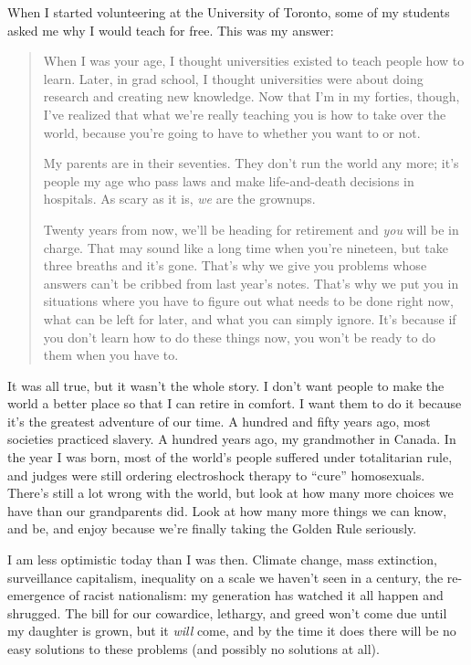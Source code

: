 
When I started volunteering at the University of Toronto,
some of my students asked me why I would teach for free.
This was my answer:

\begin{quote}

When I was your age,
I thought universities existed to teach people how to learn.
Later,
in grad school,
I thought universities were about doing research and creating new knowledge.
Now that I'm in my forties,
though,
I've realized that what we're really teaching you is
how to take over the world,
because you're going to have to whether you want to or not.

My parents are in their seventies.
They don't run the world any more;
it's people my age who pass laws
and make life-and-death decisions in hospitals.
As scary as it is,
\emph{we} are the grownups.

Twenty years from now,
we'll be heading for retirement and \emph{you} will be in charge.
That may sound like a long time when you're nineteen,
but take three breaths and it's gone.
That's why we give you problems whose answers can't be cribbed from last year's notes.
That's why we put you in situations where
you have to figure out what needs to be done right now,
what can be left for later,
and what you can simply ignore.
It's because if you don't learn how to do these things now,
you won't be ready to do them when you have to.

\end{quote}

It was all true,
but it wasn't the whole story.
I don't want people to make the world a better place so that I can retire in comfort.
I want them to do it because it's the greatest adventure of our time.
A hundred and fifty years ago,
most societies practiced slavery.
A hundred years ago,
my grandmother  in Canada.
In the year I was born,
most of the world's people suffered under totalitarian rule,
and judges were still ordering electroshock therapy to ``cure'' homosexuals.
There's still a lot wrong with the world,
but look at how many more choices we have than our grandparents did.
Look at how many more things we can know, and be, and enjoy
because we're finally taking the Golden Rule seriously.

I am less optimistic today than I was then.
Climate change,
mass extinction,
surveillance capitalism,
inequality on a scale we haven't seen in a century,
the re-emergence of racist nationalism:
my generation has watched it all happen and shrugged.
The bill for our cowardice, lethargy, and greed won't come due until my daughter is grown,
but it \emph{will} come,
and by the time it does there will be no easy solutions to these problems
(and possibly no solutions at all).

